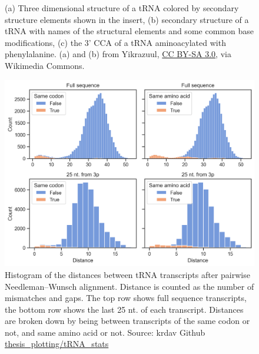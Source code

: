 \begin{figure}
\begin{subfigure}[b]{0.2\textwidth}
         \caption{}
         \label{fig:tRNA_CCAester}
     \end{subfigure}
        \caption[tRNA structure]{
        (a) Three dimensional structure of a tRNA colored by secondary structure elements shown in the insert, (b) secondary structure of a tRNA with names of the structural elements and some common base modifications, (c) the 3' CCA of a tRNA aminoacylated with phenylalanine.
        (a) and (b) from Yikrazuul, \href{https://creativecommons.org/licenses/by-sa/3.0}{CC BY-SA 3.0}, via Wikimedia Commons.
        }
\end{figure}





\begin{figure}
    \centering
    \includegraphics[width=\textwidth]{figures/chap4/tRNA_dist_hist.png}
    \caption{Histogram of the distances between tRNA transcripts after pairwise Needleman–Wunsch alignment. Distance is counted as the number of mismatches and gaps. The top row shows full sequence transcripts, the bottom row shows the last 25 nt. of each transcript. Distances are broken down by being between transcripts of the same codon or not, and same amino acid or not. Source: krdav Github \href{https://github.com/krdav/thesis_plotting/blob/main/tRNA_stats/plot_data.ipynb}{thesis\_plotting/tRNA\_stats}}
    \label{fig:dist_hist}
\end{figure}




